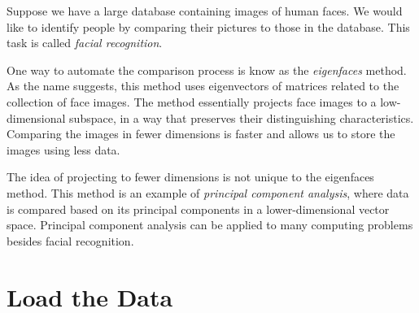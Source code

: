 \label{lab:FacialRecognition}


Suppose we have a large database containing images of human faces.
We would like to identify people by comparing their pictures to those in the database.
This task is called \emph{facial recognition}.

One way to automate the comparison process is know as the \emph{eigenfaces} method.
As the name suggests, this method uses eigenvectors of matrices related to the collection of face images.
The method essentially projects face images to a low-dimensional subspace, in a way that preserves their distinguishing characteristics.
Comparing the images in fewer dimensions is faster and allows us to store the images using less data.

The idea of projecting to fewer dimensions is not unique to the eigenfaces method.
This method is an example of \emph{principal component analysis}, where data is compared based on its principal components in a lower-dimensional vector space.
Principal component analysis can be applied to many computing problems besides facial recognition.

\begin{comment}
Facial recognition is important in law enforcement, as well as other situations.
For example, facial recognition can be combined with video surveillance to identify when a person is not authorized to be in a location.

Humans can easily compare two face images and determine whether they belong to the same person, but automating this process is more challenging.
One technique for automated facial recognition uses \emph{eigenfaces}.
\end{comment}

\section*{Load the Data} %
\begin{comment}
Eigenfaces are an efficient way to store and query a database of face images.
As the name suggests, this method uses eigenvectors of matrices related to the collection of face images.
Essentially, the method of eigenfaces projects face images to a lower-dimensional subspace in a way that preserves their distinguishing characteristics.
In the lower-dimensional subspace, comparing face images is much faster.
\end{comment}

